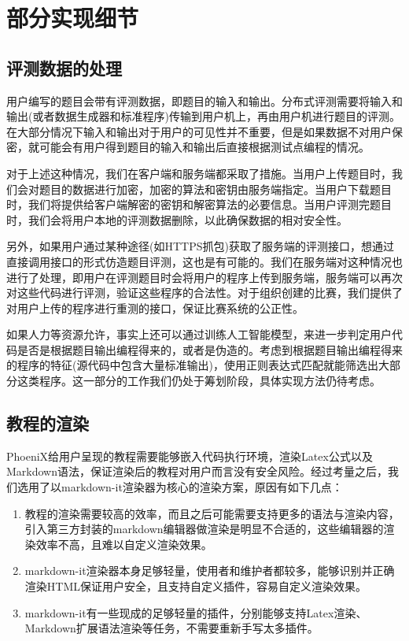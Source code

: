 \chapter{部分实现细节}

\section{评测数据的处理}

用户编写的题目会带有评测数据，即题目的输入和输出。分布式评测需要将输入和输出(或者数据生成器和标准程序)传输到用户机上，再由用户机进行题目的评测。在大部分情况下输入和输出对于用户的可见性并不重要，但是如果数据不对用户保密，就可能会有用户得到题目的输入和输出后直接根据测试点编程的情况。

对于上述这种情况，我们在客户端和服务端都采取了措施。当用户上传题目时，我们会对题目的数据进行加密，加密的算法和密钥由服务端指定。当用户下载题目时，我们将提供给客户端解密的密钥和解密算法的必要信息。当用户评测完题目时，我们会将用户本地的评测数据删除，以此确保数据的相对安全性。

另外，如果用户通过某种途径(如HTTPS抓包)获取了服务端的评测接口，想通过直接调用接口的形式仿造题目评测，这也是有可能的。我们在服务端对这种情况也进行了处理，即用户在评测题目时会将用户的程序上传到服务端，服务端可以再次对这些代码进行评测，验证这些程序的合法性。对于组织创建的比赛，我们提供了对用户上传的程序进行重测的接口，保证比赛系统的公正性。

如果人力等资源允许，事实上还可以通过训练人工智能模型，来进一步判定用户代码是否是根据题目输出编程得来的，或者是伪造的。考虑到根据题目输出编程得来的程序的特征(源代码中包含大量标准输出)，使用正则表达式匹配就能筛选出大部分这类程序。这一部分的工作我们仍处于筹划阶段，具体实现方法仍待考虑。

\section{教程的渲染}

PhoeniX给用户呈现的教程需要能够嵌入代码执行环境，渲染Latex公式以及Markdown语法，保证渲染后的教程对用户而言没有安全风险。经过考量之后，我们选用了以markdown-it渲染器为核心的渲染方案，原因有如下几点：

\begin{enumerate}
    \item 教程的渲染需要较高的效率，而且之后可能需要支持更多的语法与渲染内容，引入第三方封装的markdown编辑器做渲染是明显不合适的，这些编辑器的渲染效率不高，且难以自定义渲染效果。
    \item markdown-it渲染器本身足够轻量，使用者和维护者都较多，能够识别并正确渲染HTML保证用户安全，且支持自定义插件，容易自定义渲染效果。
    \item markdown-it有一些现成的足够轻量的插件，分别能够支持Latex渲染、Markdown扩展语法渲染等任务，不需要重新手写太多插件。
\end{enumerate}

